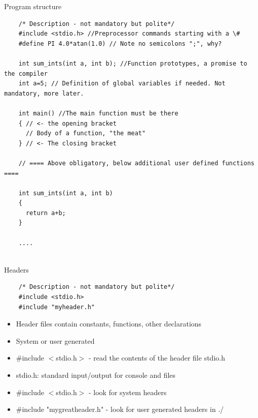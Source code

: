 \documentclass[10pt]{beamer}
\begin{document}
\begin{frame}[fragile]{Program structure}
    \begin{lstlisting}
    /* Description - not mandatory but polite*/
    #include <stdio.h> //Preprocessor commands starting with a \#
    #define PI 4.0*atan(1.0) // Note no semicolons ";", why?
   
    int sum_ints(int a, int b); //Function prototypes, a promise to the compiler
    int a=5; // Definition of global variables if needed. Not mandatory, more later.
   
    int main() //The main function must be there
    { // <- the opening bracket
      // Body of a function, "the meat"
    } // <- The closing bracket
   
    // ==== Above obligatory, below additional user defined functions ====
   
    int sum_ints(int a, int b)
    {
      return a+b;
    }
   
    ....
   
    \end{lstlisting}
 
\end{frame}

\begin{frame}[fragile]{Headers}

    \begin{lstlisting}
    /* Description - not mandatory but polite*/
    #include <stdio.h>
    #include "myheader.h"
    \end{lstlisting}
    \vspace{0.2cm}

  \begin{itemize}
    \item Header files contain constants, functions, other declarations
    \item System or user generated
    \item \#include $<$stdio.h$>$ - read the contents of the header file stdio.h
    \item stdio.h: standard input/output for console and files
    \item \#include $<$stdio.h$>$ - look for system headers
    \item \#include "mygreatheader.h" - look for user generated headers in ./
  \end{itemize}
 
\end{frame}
\end{document}
